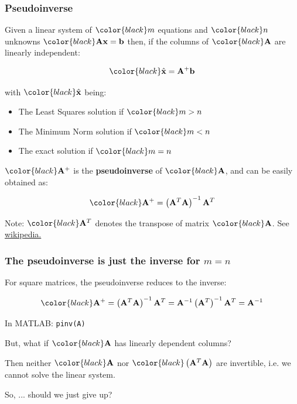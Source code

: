 \documentclass[compress]{beamer}
\newcommand{\black}[1]{{\color{black}#1}}
\renewcommand{\emph}[1]{\textbf{\black{#1}}}
\newcommand{\beq}[1]{\[\black{#1}\]}
\begin{document}

\begin{frame}
\frametitle{Pseudoinverse}

Given a linear system of $\black{m}$ equations and $\black{n}$ unknowns $\black{\A\x = \b}$ then, if the columns of $\black{\A}$ are linearly independent:

\beq{
\hat{\x} = \A^+\b
}

with $\black{\hat{\x}}$ being:

\begin{itemize}
\item The Least Squares solution if $\black{m > n}$
\item The Minimum Norm solution if $\black{m < n}$
\item The exact solution if $\black{m=n}$
\end{itemize}

\vspace{.5cm}
$\black{\A^+}$ is the \emph{pseudoinverse} of $\black{\A}$, and can be easily obtained as:

\beq{
\A^+ = \left(\A^T\A\right)^{-1}\A^T
}

\tiny{\black{Note:} $\black{\A^T}$ denotes the transpose of matrix $\black{\A}$. See \href{http://en.wikipedia.org/wiki/Transpose}{wikipedia.}}


\end{frame}




\begin{frame}[fragile]
\frametitle{The pseudoinverse is just the inverse for $m=n$}

For square matrices, the pseudoinverse reduces to the inverse:

\beq{
\A^+ = \left(\A^T\A\right)^{-1}\A^T = \A^{-1}\left(\A^T\right)^{-1}\A^T =  \A^{-1}
}

\vspace{.5cm}
In MATLAB: \color{black}\verb|pinv(A)|\color{gray}

\vspace{.5cm}
But, what if $\black{\A}$ has linearly dependent columns?

\vspace{.5cm}
Then neither $\black{\A}$ nor $\black{\left(\A^T\A\right)}$ are invertible, i.e. we cannot solve the linear system.

\vspace{.5cm}
\alert{So, ... should we just give up?}

\end{frame}
\end{document}

